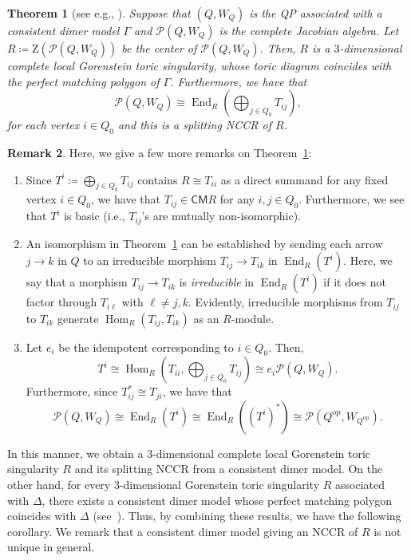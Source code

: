 \documentclass[11pt]{amsart}
\newtheorem{theo}{Theorem}[section]
\theoremstyle{definition}
\newtheorem{rema}[theo]{Remark}
\newcommand{\rmZ}{\mathrm{Z}}
\newcommand{\calP}{\mathcal{P}}
\DeclareMathOperator{\op}{op}
\DeclareMathOperator{\Hom}{Hom}
\DeclareMathOperator{\End}{End}
\newcommand{\CM}{\mathsf{CM}}
\begin{document}
\begin{theo}[{see e.g., \cite{Boc2,Bro,IU2}}]\label{NCCR1}
Suppose that $(Q, W_Q)$ is the QP associated with a consistent dimer model $\Gamma$ and $\calP(Q, W_Q)$ is the complete Jacobian algebra. Let $R\coloneqq \rmZ(\calP(Q, W_Q))$ be the center of $\calP(Q, W_Q)$. Then, $R$ is a $3$-dimensional complete local Gorenstein toric singularity, whose toric diagram coincides with the perfect matching polygon of $\Gamma$. Furthermore, we have that
\[
\calP(Q, W_Q)\cong\End_R\left(\bigoplus_{j\in Q_0}T_{ij}\right),
\]
for each vertex $i\in Q_0$ and this is a splitting NCCR of $R$.
\end{theo}


\begin{rema}\label{rem_NCCR}
Here, we give a few more remarks on Theorem~\ref{NCCR1}:
\begin{enumerate}%
\item Since $T^i\coloneqq\bigoplus_{j\in Q_0}T_{ij}$ contains $R\cong T_{ii}$ as a direct summand for any fixed vertex $i\in Q_0$, we have that $T_{ij}\in\CM R$ for any $i, j \in Q_0$. Furthermore, we see that $T^i$ is basic (i.e., $T_{ij}$'s are mutually non-isomorphic).

\item An isomorphism in Theorem~\ref{NCCR1} can be established by sending each arrow $j\rightarrow k$ in $Q$ to an irreducible morphism $T_{ij}\rightarrow T_{ik}$ in $\End_R(T^i)$. Here, we say that a morphism $T_{ij}\rightarrow T_{ik}$ is \emph{irreducible} in $\End_R(T^i)$ if it does not factor through $T_{i\ell}$ with $\ell\neq j,k$. Evidently, irreducible morphisms from $T_{ij}$ to $T_{ik}$ generate $\Hom_R(T_{ij},T_{ik})$ as an $R$-module.

\item Let $e_i$ be the idempotent corresponding to $i\in Q_0$. Then,
\[
T^i\cong\Hom_R\left(T_{ii},\bigoplus_{j\in Q_0}T_{ij}\right)\cong e_i\calP(Q, W_Q).
\]
Furthermore, since $T_{ij}^* \cong T_{ji}$, we have that
\[
\calP(Q, W_Q)\cong\End_R(T^i)\cong\End_R((T^i)^*)\cong\calP(Q^{\op}, W_{Q^{\op}}).
\]
\end{enumerate}
\end{rema}

In this manner, we obtain a $3$-dimensional complete local Gorenstein toric singularity $R$ and its splitting NCCR from a consistent dimer model. On the other hand, for every $3$-dimensional Gorenstein toric singularity $R$ associated with $\Delta$, there exists a consistent dimer model whose perfect matching polygon coincides with $\Delta$ (see~\cite{Gul,IU2}). Thus, by combining these results, we have the following corollary. We remark that a consistent dimer model giving an NCCR of $R$ is not unique in general.
\end{document}
